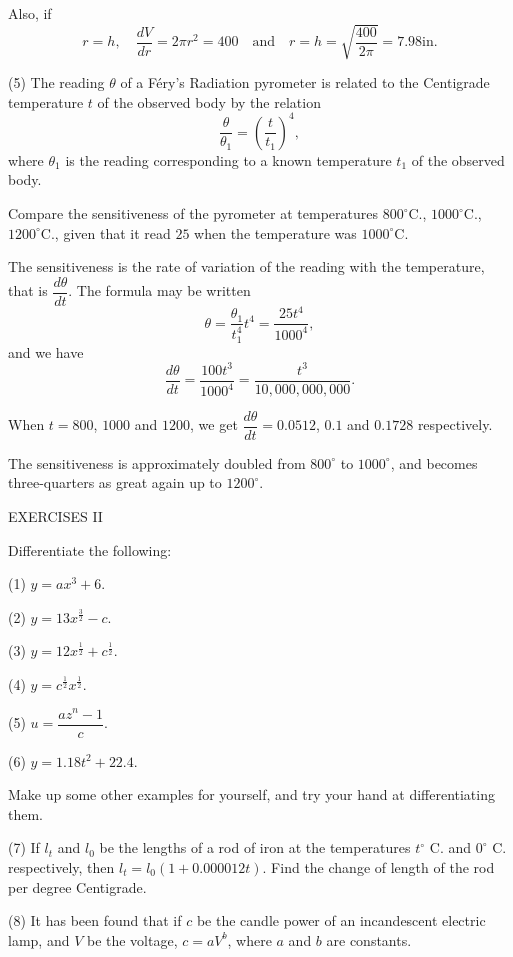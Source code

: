 \documentclass{ximera}
\begin{document}
{{{Also, if
\[
r=h,\quad \dfrac{dV}{dr} = 2\pi r^2 = 400\quad \text{and}\quad r = h = \sqrt{\dfrac{400}{2\pi}} = 7.98 \text{in}.
\]

(5) The reading $\theta$ of a F\'ery's Radiation pyrometer
is related to the Centigrade temperature $t$ of the
observed body by the relation
\[
\dfrac{\theta}{\theta_1} = \left(\dfrac{t}{t_1}\right)^4,
\]
where $\theta_1$ is the reading corresponding to a known temperature $t_1$
of the observed body.

Compare the sensitiveness of the pyrometer at
temperatures $800^\circ$C., $1000^\circ$C., $1200^\circ$C., given that it
read $25$ when the temperature was $1000^\circ$C.

The sensitiveness is the rate of variation of the
reading with the temperature, that is $\dfrac{d\theta}{dt}$. The formula
may be written
\[
\theta = \dfrac{\theta_1}{t_1^4} t^4 = \dfrac{25t^4}{1000^4},
\]
and we have
\[
\dfrac{d\theta}{dt} = \dfrac{100t^3}{1000^4} = \dfrac{t^3}{10,000,000,000}.
\]

When $t=800$, $1000$ and $1200$, we get $\dfrac{d\theta}{dt} = 0.0512$, $0.1$ and
$0.1728$ respectively.

The sensitiveness is approximately doubled from
$800^\circ$ to $1000^\circ$, and becomes three-quarters as great
again up to $1200^\circ$.

\begin{center} EXERCISES II \end{center}

Differentiate the following:
 
(1) $y = ax^3 + 6$.

(2) $y = 13x^{\frac{3}{2}} - c$.

(3) $y = 12x^{\frac{1}{2}} + c^{\frac{1}{2}}$.

(4) $y = c^{\frac{1}{2}} x^{\frac{1}{2}}$.

(5) $u = \dfrac{az^n - 1}{c}$.

(6) $y = 1.18t^2 + 22.4$.

Make up some other examples for yourself, and try
your hand at differentiating them.

(7) If $l_t$ and $l_0$ be the lengths of a rod of iron at
the temperatures $t^\circ$ C. and $0^\circ$ C. respectively, then
$l_t = l_0(1 + 0.000012t)$. Find the change of length of the
rod per degree Centigrade.

(8) It has been found that if $c$ be the candle power
of an incandescent electric lamp, and $V$ be the voltage,
$c = aV^b$, where $a$ and $b$ are constants.

}}}
\end{document}
